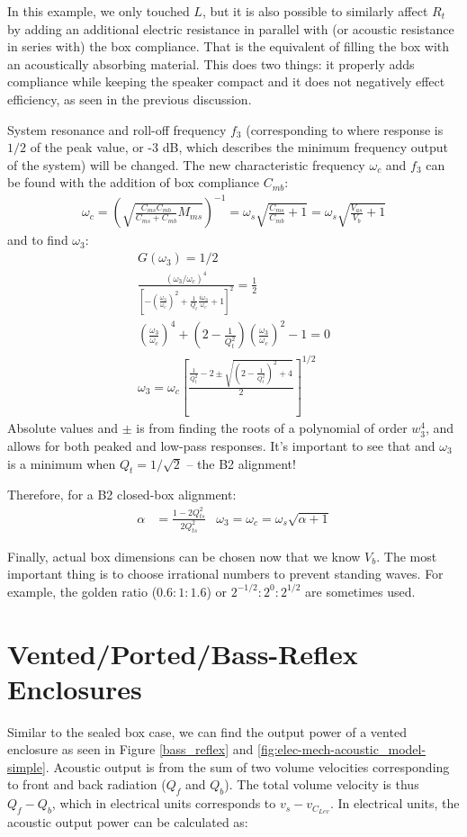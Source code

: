 \documentclass[10pt]{book}
\begin{document}
In this example, we only touched $L$, but it is also possible to similarly affect $R_t$ by adding an additional electric resistance in parallel with (or acoustic resistance in series with) the box compliance. That is the equivalent of filling the box with an acoustically absorbing material. This does two things: it properly adds compliance while keeping the speaker compact and it does not negatively effect efficiency, as seen in the previous discussion.

System resonance and roll-off frequency $f_3$ (corresponding to where response is $1/2$ of the peak value, or -3 dB, which describes the minimum frequency output of the system) will be changed. The new characteristic frequency $\omega_c$ and $f_3$ can be found with the addition of box compliance $C_{mb}$:
\begin{align}
\omega_c=\left( \sqrt{\frac{C_{ms}C_{mb}}{C_{ms}+C_{mb}}M_{ms}}  \right)^{-1}=\omega_s\sqrt{\frac{C_{ms}}{C_{mb}}+1}=\omega_s\sqrt{\frac{V_{as}}{V_{b}}+1}
\end{align}
and to find $\omega_3$:
\begin{align}
G(\omega_3)=1/2\\
\frac{(\omega_3/\omega_c )^4}{
\left[ -\left( \frac{\omega_3}{\omega_c} \right)^2 +\frac{1}{Q_t}\frac{i\omega_3}{\omega_c}+1\right]^{2}} = \frac{1}{2}\\
\left( \frac{\omega_3}{\omega_c} \right)^4 +\left( 2 -\frac{1}{Q_t^2}\right)\left(\frac{\omega_3}{\omega_c} \right)^2-1=0\\
\omega_3=\omega_c \left[ \frac{  \frac{1}{Q_{t}^2}-2  \pm \sqrt{\left( 2- \frac{1}{Q_{t}^2}\right)^2+4}}{2}\right]^{1/2}
\end{align}
Absolute values and $\pm$ is from finding the roots of a polynomial of order $w_3^4$, and allows for both peaked and low-pass responses. It's important to see that and $\omega_3$ is a minimum when $Q_t=1/\sqrt{2}$ -- the B2 alignment!

Therefore, for a B2 closed-box alignment:
\begin{align}
\alpha&=\frac{1-2 Q_{ts}^2}{2 Q_{ts}^2} & \omega_3=\omega_c=\omega_s\sqrt{\alpha+1}
\end{align}

Finally, actual box dimensions can be chosen now that we know $V_b$. The most important thing is to choose irrational numbers to prevent standing waves. For example, the golden ratio ($0.6:1:1.6$) or ${2}^{-1/2}:{2}^{0}:{2}^{1/2}$ are sometimes used.

\section{Vented/Ported/Bass-Reflex Enclosures} Similar to the sealed box case, we can find the output power of a vented enclosure as seen in Figure \ref{bass_reflex} and \ref{fig:elec-mech-acoustic_model-simple}. Acoustic output is from the sum of two volume velocities corresponding to front and back radiation ($Q_f$ and $Q_b$). The total volume velocity is thus $Q_f-Q_b$, which in electrical units corresponds to  $v_s-v_{C_{Lev}}$. In electrical units, the acoustic output power can be calculated as:
\end{document}
